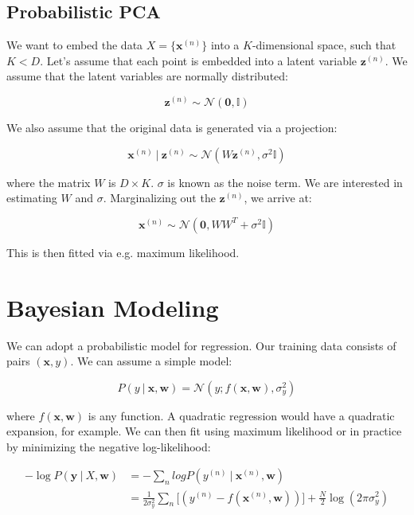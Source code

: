 \documentclass{article}
\newcommand{\vf}[1]{\mathbf{#1}}
\newcommand{\bx}{\vf{x}}
\newcommand{\by}{\vf{y}}
\newcommand{\bw}{\vf{w}}
\newcommand{\giv}{\ |\ }
\begin{document}
\subsection{Probabilistic PCA}
We want to embed the data $X = \{\vf{x}^{(n)}\}$ into a $K$-dimensional space, such that $K < D$. Let's assume that each point is embedded into a latent variable $\vf{z}^{(n)}$. We assume that the latent variables are normally distributed:

\begin{equation*}
    \vf{z}^{(n)} \sim \mathcal{N}(\vf{0}, \mathbb{I})
\end{equation*}

We also assume that the original data is generated via a projection:

\begin{equation}
    \vf{x}^{(n)}\ |\ \vf{z}^{(n)} \sim \mathcal{N}(W\vf{z}^{(n)}, \sigma^2 \mathbb{I})
\end{equation}

where the matrix $W$ is $D\times K$. $\sigma$ is known as the noise term. We are interested in estimating $W$ and $\sigma$. Marginalizing out the $\vf{z}^{(n)}$, we arrive at:

\begin{equation}
    \vf{x}^{(n)} \sim \mathcal{N}(\vf{0}, WW^T + \sigma^2 \mathbb{I})
\end{equation}

This is then fitted via e.g. maximum likelihood.

\section{Bayesian Modeling}
We can adopt a probabilistic model for regression. Our training data consists of pairs $(\bx, y)$. We can assume a simple model:

\begin{equation*}
    P(y\ |\ \bx, \bw) = \mathcal{N}(y; f(\bx, \bw), \sigma_y^2)
\end{equation*}

where $f(\bx, \bw)$ is any function. A quadratic regression would have a quadratic expansion, for example. We can then fit using maximum likelihood or in practice by minimizing the negative log-likelihood:

\begin{align*}
    - \log P(\by \giv X, \bw) &= - \sum_n logP(y^{(n)} \giv \bx^{(n)}, \bw) \\
        &= \frac{1}{2 \sigma_y^2} \sum_n \big[  (y^{(n)} - f(\bx^{(n)}, \bw)) \big] + \frac{N}{2} \log(2 \pi \sigma_y^2)
\end{align*}
\end{document}
